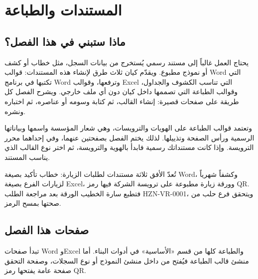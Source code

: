 \chapter{المستندات والطباعة}
\label{ch:builder-documents}

\section{ماذا ستبني في هذا الفصل؟}
\label{sec:builder-documents-intro}

يحتاج العمل غالباً إلى مستند رسمي يُستخرج من بيانات السجل، مثل خطاب أو كشف أو نموذج مطبوع. ويقدّم كيان ثلاث طرق لإنشاء هذه المستندات: قوالب Word التي تكتبها في برنامج Word وترفعها، وقوالب Excel التي تناسب الكشوف والجداول، وقوالب الطباعة التي تصممها داخل كيان دون أي ملف خارجي. ويشرح الفصل كل طريقة على صفحات قصيرة: إنشاء القالب، ثم كتابة وسومه أو عناصره، ثم اختباره ونشره.

وتعتمد قوالب الطباعة على الهويات والترويسات، وهي شعار المؤسسة واسمها وبياناتها الرسمية ورأس الصفحة وتذييلها. لذلك يختم الفصل بصفحتين عنهما، وفي إحداهما محرر الترويسة. وإذا كانت مستنداتك رسمية فابدأ بالهوية والترويسة، ثم اختر نوع القالب الذي يناسب المستند.

\begin{rcnote}
تُعدّ الأفق ثلاثة مستندات لطلبات الزيارة: خطاب تأكيد بصيغة Word، وكشفاً شهرياً لزيارات الفرع بصيغة Excel، وورقة زيارة مطبوعة على ترويسة الشركة فيها رمز QR. فتطبع سارة الخطيب الورقة بعد مراجعة الطلب HZN-VR-0001، ويتحقق فرع حلب من صحتها بمسح الرمز.
\end{rcnote}

\section{صفحات هذا الفصل}
\label{sec:builder-documents-pages}

تبدأ صفحات Word وExcel والطباعة كلها من قسم «الأساسية» في أدوات البناء. أما منشئ قالب الطباعة فيُفتح من داخل منشئ النموذج أو نوع السجلات، وصفحة التحقق صفحة عامة يفتحها رمز QR.

